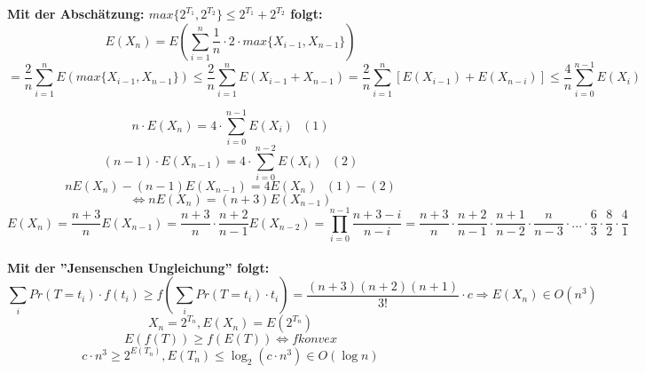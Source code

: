 \textbf{Mit der Abschätzung: $max\{2^{T_1}, 2^{T_2}\} \leq 2^{T_1} + 2^{T_2}$ folgt:}
\[E(X_n) = E \left(\sum^n_{i=1} \frac{1}{n} \cdot  2 \cdot max\{X_{i-1}, X_{n-1}\} \right) \]
\[= \frac{2}{n} \sum^n_{i=1} E \left(max\{X_{i-1}, X_{n-1}\} \right) \leq \frac{2}{n} \sum^n_{i=1} E \left(X_{i-1} + X_{n-1} \right) = \frac{2}{n} \sum^n_{i=1} \left[E(X_{i-1}) + E(X_{n-i}) \right] \leq \frac{4}{n} \sum^{n-1}_{i=0} E(X_i)\] 

\[ n \cdot E(X_n) = 4 \cdot \sum^{n-1}_{i=0} E(X_i) ~~~(1)\]
\[ (n-1) \cdot E(X_{n-1}) = 4 \cdot \sum^{n-2}_{i=0} E(X_i) ~~~(2)\]
\[ nE(X_n) - (n-1)E(X_{n-1}) = 4E(X_n) ~~~(1)-(2)\]
\[\Leftrightarrow nE(X_n) = (n+3)E(X_{n-1})\]
\[E(X_n)=\frac{n+3}{n}E(X_{n-1})=\frac{n+3}{n} \cdot \frac{n+2}{n-1}E(X_{n-2}) = \prod^{n-1}_{i=0} \frac{n+3-i}{n-i} = \frac{n+3}{n} \cdot \frac{n+2}{n-1} \cdot \frac{n+1}{n-2} \cdot \frac{n}{n-3} \cdot ... \cdot \frac{6}{3} \cdot \frac{8}{2} \cdot \frac{4}{1} \]\\

\textbf{Mit der ''Jensenschen Ungleichung'' folgt:}
\[ \sum_i Pr(T=t_i) \cdot f(t_i) \geq f\left(\sum_i Pr(T=t_i) \cdot t_i\right) = \frac{ (n+3)(n+2)(n+1) } { 3!}  \cdot c \Rightarrow E(X_n) \in O(n^3)\]
\[X_n = 2^{T_n},  E(X_n) = E(2^{T_n}) \]
\[E(f(T)) \geq f(E(T)) \Leftrightarrow f konvex\]
\[c \cdot n^3 \geq 2^{E(T_n)}, E(T_n) \leq \log_2(c \cdot n^3) \in O(\log n) \]

